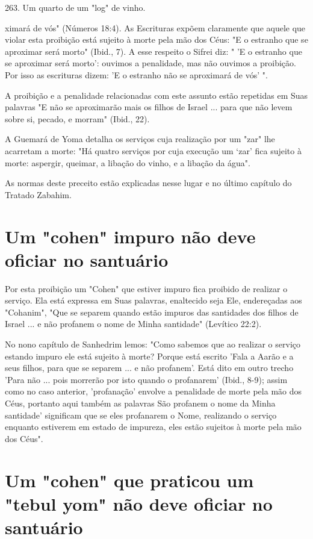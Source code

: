 \begin{itemize}
\begin{enumrate}
\begin{itemize}
\begin{itemize}
\begin{itemize}
263. Um quarto de um "log" de vinho.


ximará de vós" (Números 18:4). As Escrituras expõem claramente que
aquele que violar esta proibição está sujeito à morte pela mão dos Céus:
"E o estranho que se aproximar será morto" (Ibid., 7). A esse respeito o
Sifrei diz: " 'E o es­tranho que se aproximar será morto': ouvimos a
penalidade, mas não ouvimos a proibição. Por isso as escrituras dizem:
'E o estranho não se aproximará de vós' ".

A proibição e a penalidade relacionadas com este assunto estão
re­petidas em Suas palavras "E não se aproximarão mais os filhos de
Israel ... para que não levem sobre si, pecado, e morram" (Ibid., 22).

A Guemará de Yoma detalha os serviços cuja realização por um "zar" lhe
acarretam a morte: "Há quatro serviços por cuja execução um `zar' fica
su­jeito à morte: aspergir, queimar, a libação do vinho, e a libação da
água".

As normas deste preceito estão explicadas nesse lugar e no último
capítulo do Tratado Zabahim.


\section{Um "cohen" impuro não deve oficiar no santuário}


Por esta proibição um "Cohen" que estiver impuro fica proibido de
realizar o serviço. Ela está expressa em Suas palavras, enaltecido seja
Ele, ende­reçadas aos "Cohanim", "Que se separem quando estão impuros
das santida­des dos filhos de Israel ... e não profanem o nome de Minha
santidade" (Levíti­co 22:2).

No nono capítulo de Sanhedrim lemos: "Como sabemos que ao rea­lizar o
serviço estando impuro ele está sujeito à morte? Porque está escrito
'Fa­la a Aarão e a seus filhos, para que se separem ... e não profanem'.
Está dito em outro trecho 'Para não ... pois morrerão por isto quando o
profanarem' (Ibid., 8-9); assim como no caso anterior, 'profanação'
envolve a penalidade de morte pela mão dos Céus, portanto aqui também as
palavras São profanem o nome da Minha santidade' significam que se eles
profanarem o Nome, realizando o serviço enquanto estiverem em estado de
impureza, eles estão sujeitos à morte pela mão dos Céus".

\section{Um "cohen" que praticou um "tebul yom" não deve oficiar no santuário}


\end{itemize}
\end{itemize}
\end{itemize}
\end{enumrate}
\end{itemize}
